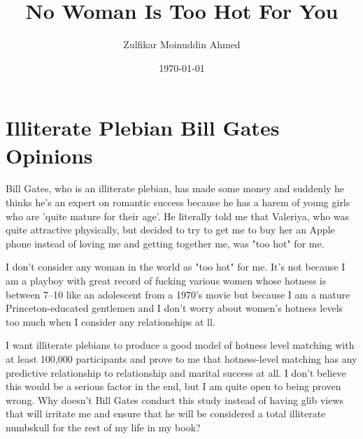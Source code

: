 \documentclass{amsart}
\title{No Woman Is Too Hot For You}
\author{Zulfikar Moinuddin Ahmed}
\date{\today}
\begin{document}
\maketitle

\section{Illiterate Plebian Bill Gates Opinions}

Bill Gates, who is an illiterate plebian, has made some money and suddenly he thinks he's an expert on romantic success because he has a harem of young girls who are 'quite mature for their age'.  He literally told me that Valeriya, who was quite attractive physically, but decided to try to get me to buy her an Apple phone instead of loving me and getting together me, was "too hot" for me.

I don't consider any woman in the world as "too hot" for me.  It's not because I am a playboy with great record of fucking various women whose hotness is between 7--10 like an adolescent from a 1970's movie but because I am a mature Princeton-educated gentlemen and I don't worry about women's hotness levels too much when I consider any relationships at ll.  

I want illiterate plebians to produce a good model of hotness level matching with at least 100,000 participants and prove to me that hotness-level matching has any predictive relationship to relationship and marital success at all.  I don't believe this would be a serious factor in the end, but I am quite open to being proven wrong.  Why doesn't Bill Gates conduct this study instead of having glib views that will irritate me and ensure that he will be considered a total illiterate numbskull for the rest of my life in my book?  
\end{document}

